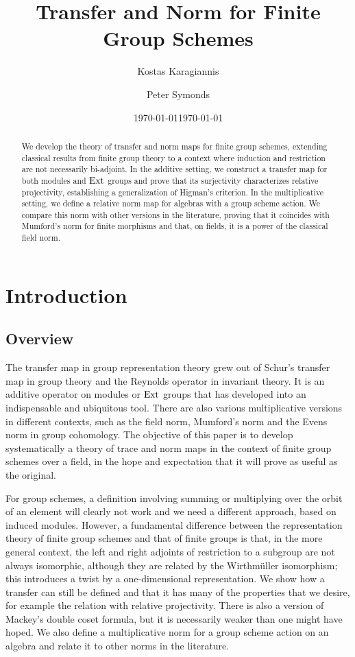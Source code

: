 \documentclass[12pt]{amsart}
\date{\today}
\title{Transfer and Norm for Finite Group Schemes}
\author[K. Karagiannis]{Kostas Karagiannis }
\author[P. Symonds]{Peter Symonds }
\date \today
\theoremstyle{definition}
\begin{document}
\begin{abstract}
	We develop the theory of transfer and norm maps for finite group schemes, extending classical results from finite group theory to a context where induction and restriction are not necessarily bi-adjoint. In the additive setting, we construct a  transfer map for both modules and $\rm Ext $ groups and prove that its surjectivity characterizes relative projectivity, establishing a  generalization of Higman's criterion. In the multiplicative setting, we define a relative norm map for algebras with a group scheme action. We compare this norm with other versions in the literature, proving that it coincides with Mumford's norm for finite morphisms and that, on fields, it is a power of the classical field norm.
\end{abstract}
\maketitle


\section{Introduction}


\subsection{Overview} The transfer map in group representation theory grew out of Schur's transfer map in group theory and the Reynolds operator in invariant theory. It is an additive operator on modules or ${\rm Ext}$ groups that  has developed into an indispensable and ubiquitous tool.  There are also various multiplicative versions in different contexts, such as the field norm, Mumford's norm and the Evens norm in group cohomology. The objective of this paper is to develop systematically a theory of trace and norm maps in the context of finite group schemes over a field, in the hope and expectation that it will prove as useful as the original.

 For group schemes, a definition involving summing or multiplying over the orbit of an element will clearly not work and we need a different approach, based on induced modules. However, a fundamental difference between the representation theory of finite group schemes and that of finite groups is that, in the more general context, the left and right adjoints of restriction to a subgroup  are not always isomorphic, although they are related by the Wirthm\"uller isomorphism; this introduces a twist by a one-dimensional representation. We show how a transfer can still be defined and that it has many of the properties that we desire, for example the relation with relative projectivity. There is also a version of Mackey's double coset formula, but it is necessarily weaker than one might have hoped. We also define a multiplicative norm for a group scheme action on an algebra and relate it to other norms in the literature.
\end{document}
